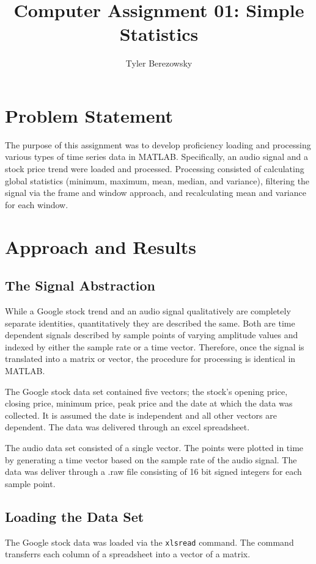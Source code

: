 \documentclass[11pt]{article}
\title{Computer Assignment 01: Simple Statistics}
\author{Tyler Berezowsky}
\begin{document}
\maketitle
\section{Problem Statement} 
The purpose of this assignment was to develop proficiency loading and processing various types of time series data in MATLAB. Specifically, an audio signal and a stock price trend were loaded and processed. Processing consisted of calculating global statistics (minimum, maximum, mean, median, and variance), filtering the signal via the frame and window approach, and recalculating mean and variance for each window. 
\section{Approach and Results} 
\subsection{The Signal Abstraction} 
While a Google stock trend and an audio signal qualitatively are completely separate identities, quantitatively they are described the same. Both are time dependent signals described by sample points of varying amplitude values and indexed by either the sample rate or a time vector. Therefore, once the signal is translated into a matrix or vector, the procedure for processing is identical in MATLAB. 


The Google stock data set contained five vectors; the stock's opening price, closing price, minimum price, peak price and the date at which the data was collected. It is assumed the date is independent and all other vectors are dependent. The data was delivered through an excel spreadsheet. 


The audio data set consisted of a single vector. The points were plotted in time by generating a time vector based on the sample rate of the audio signal. The data was deliver through a .raw file consisting of 16 bit signed integers for each sample point. 


\subsection{Loading the Data Set}
The Google stock data was loaded via the \verb|xlsread| command. The command transferrs each column of a spreadsheet into a vector of a matrix.
\end{document}
